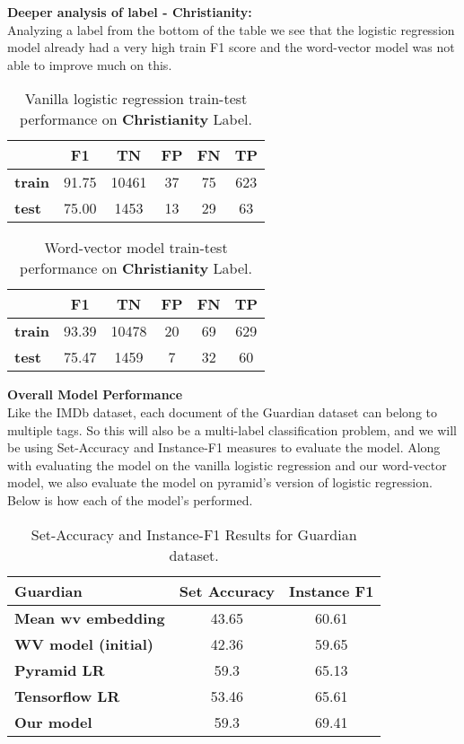 \noindent \textbf{Deeper analysis of label - Christianity:}\\

Analyzing a label from the bottom of the table we see that the logistic regression model already had a very high train F1 score and the word-vector model was not able to improve much on this.

\begin{table}[h]
\centering
\begin{tabular}{l|c|c|c|c|c|}
 & \textbf{F1} & \textbf{TN} & \textbf{FP} & \textbf{FN} & \textbf{TP} \\ \hline
\textbf{train} & 91.75 & 10461 & 37 & 75 & 623 \\
\textbf{test} & 75.00 & 1453 & 13 & 29 & 63
\end{tabular}
\caption{\label{tab:widgets}Vanilla logistic regression train-test performance on \textbf{Christianity} Label.}
\end{table}

\begin{table}[h!]
\centering
\begin{tabular}{l|c|c|c|c|c|}
 & \textbf{F1} & \textbf{TN} & \textbf{FP} & \textbf{FN} & \textbf{TP} \\ \hline
\textbf{train} & 93.39 & 10478 & 20 & 69 & 629 \\
\textbf{test} & 75.47 & 1459 & 7 & 32 & 60
\end{tabular}
\caption{\label{tab:widgets}Word-vector model train-test performance on \textbf{Christianity} Label.}
\end{table}

\newpage
\noindent \textbf{Overall Model Performance}\\

Like the IMDb dataset, each document of the Guardian dataset can belong to multiple tags. So this will also be a multi-label classification problem, and we will be using Set-Accuracy and Instance-F1 measures to evaluate the model. Along with evaluating the model on the vanilla logistic regression and our word-vector model, we also evaluate the model on pyramid's version of logistic regression. Below is how each of the model's performed.

\begin{table}[htbp]
\centering
\begin{tabular}{l|c|c}
Guardian & \multicolumn{1}{l|}{\textbf{Set Accuracy}} & \textbf{Instance F1} \\ \hline
\textbf{Mean wv embedding} & 43.65 & 60.61 \\
\textbf{WV model (initial)} & 42.36 & 59.65 \\
\textbf{Pyramid LR} & 59.3 & 65.13 \\
\textbf{Tensorflow LR} & 53.46 & 65.61 \\
\textbf{Our model} & 59.3 & 69.41
\end{tabular}
\caption{\label{tab:widgets}Set-Accuracy and Instance-F1 Results for Guardian dataset.}
\end{table}


